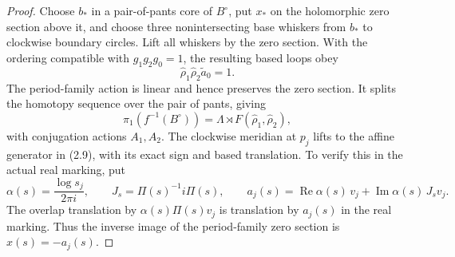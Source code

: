 \begin{proof}
Choose \(b_*\) in a pair-of-pants core of \(B^\circ\), put \(x_*\) on the
holomorphic zero section above it, and choose three nonintersecting base
whiskers from \(b_*\) to clockwise boundary circles.  Lift all whiskers by
the zero section.  With the ordering compatible with \(g_1g_2g_0=1\), the
resulting based loops obey
\[
 \widehat\rho_1\widehat\rho_2\widetilde a_0=1.
\tag{5.23a}
\]
The period-family action is linear and hence preserves the zero section.
It splits the homotopy sequence over the pair of pants, giving
\[
 \pi_1(f^{-1}(B^\circ))=
 \Lambda\rtimes F(\widehat\rho_1,\widehat\rho_2),
\]
with conjugation actions \(A_1,A_2\).  The clockwise meridian at
\(p_j\) lifts to the affine generator in (2.9), with its exact
sign and based translation.  To verify this in the actual
real marking, put
\[
 \alpha(s)=\frac{\log s_j}{2\pi i},\qquad
 J_s=\Pi(s)^{-1}i\Pi(s),\qquad
 a_j(s)=\operatorname{Re}\alpha(s)\,v_j+
        \operatorname{Im}\alpha(s)\,J_s v_j.
\]
The overlap translation by
\(\alpha(s)\Pi(s)v_j\) is translation by \(a_j(s)\) in the real
marking.  Thus the inverse image of the period-family zero section
is \(x(s)=-a_j(s)\).


\end{proof}
